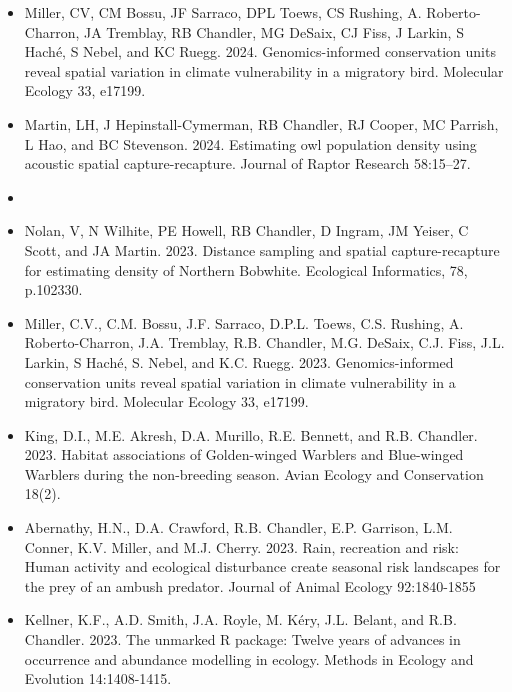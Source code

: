 \documentclass[12pt]{article}
\begin{document}
\begin{itemize}
\item Miller, CV, CM Bossu, JF Sarraco, DPL Toews, CS Rushing,
  A. Roberto-Charron, JA Tremblay, RB Chandler, MG DeSaix, CJ Fiss, J
  Larkin, S Hach\'e, S Nebel, and KC Ruegg. 2024. Genomics-informed
  conservation units reveal spatial variation in climate vulnerability
  in a migratory bird. Molecular Ecology 33, e17199.

\item Martin, LH, J Hepinstall-Cymerman, RB Chandler, RJ Cooper, MC
  Parrish, L Hao, and BC Stevenson. 2024. Estimating owl population
  density using acoustic spatial capture-recapture. Journal of Raptor
  Research 58:15--27. 


\item[] { \\}

\item Nolan, V, N Wilhite, PE Howell, RB Chandler, D Ingram,
  JM Yeiser, C Scott, and JA Martin. 2023. Distance
  sampling and spatial capture-recapture for estimating density of
  Northern Bobwhite. Ecological Informatics, 78, p.102330. 

\item Miller, C.V., C.M. Bossu, J.F. Sarraco, D.P.L. Toews,
  C.S. Rushing, A. Roberto-Charron, J.A. Tremblay, R.B. Chandler,
  M.G. DeSaix, C.J. Fiss, J.L. Larkin, S Hach\'{e}, S. Nebel, and
  K.C. Ruegg. 2023. Genomics-informed conservation units reveal
  spatial variation in climate vulnerability in a migratory
  bird. Molecular Ecology 33, e17199.

\item King, D.I., M.E. Akresh, D.A. Murillo, R.E. Bennett, and R.B.
  Chandler. 2023. Habitat associations of Golden-winged Warblers and
  Blue-winged Warblers during the non-breeding season. Avian Ecology
  and Conservation 18(2).  

\item Abernathy, H.N., D.A. Crawford, R.B. Chandler, E.P. Garrison,
  L.M. Conner, K.V. Miller, and M.J. Cherry. 2023. Rain, recreation
  and risk: Human activity and ecological disturbance create seasonal
  risk landscapes for the prey of an ambush predator. Journal of
  Animal Ecology 92:1840-1855
  
\item Kellner, K.F., A.D. Smith, J.A. Royle, M. K\'ery, J.L. Belant,
  and R.B. Chandler. 2023. The unmarked R package: Twelve years of
  advances in occurrence and abundance modelling in ecology. Methods
  in Ecology and Evolution 14:1408-1415. 
  

\end{itemize}
\end{document}
